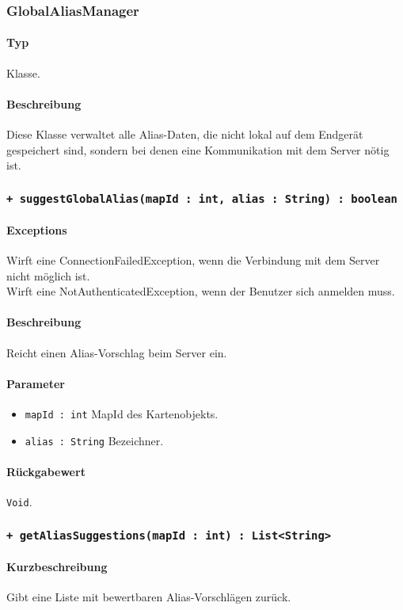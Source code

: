 \subsubsection{GlobalAliasManager}
\paragraph*{Typ}
Klasse.
\paragraph*{Beschreibung}
Diese Klasse verwaltet alle Alias-Daten, die nicht lokal auf dem Endgerät gespeichert sind, 
sondern bei denen eine Kommunikation mit dem Server nötig ist.

\subsubsection*{\texttt{+ suggestGlobalAlias(mapId : int, alias : String) : boolean}}%
\paragraph*{Exceptions}
Wirft eine ConnectionFailedException, wenn die Verbindung mit dem Server nicht möglich ist.\\
Wirft eine NotAuthenticatedException, wenn der Benutzer sich anmelden muss.
\paragraph*{Beschreibung}
Reicht einen Alias-Vorschlag beim Server ein.
\paragraph*{Parameter}
\begin{itemize}
    \item \texttt{mapId : int} MapId des Kartenobjekts.
    \item \texttt{alias : String} Bezeichner.
\end{itemize}
\paragraph*{Rückgabewert}
\texttt{Void}.

\subsubsection*{\texttt{+ getAliasSuggestions(mapId : int) : List<String>}}%
\paragraph*{Kurzbeschreibung}
Gibt eine Liste mit bewertbaren Alias-Vorschlägen zurück.
